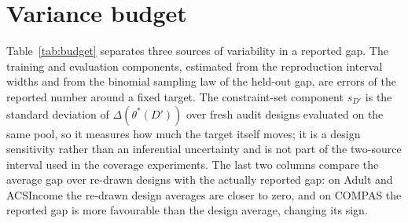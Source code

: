 \documentclass[11pt]{article}
\begin{document}
\begin{table}[h]
\centering
\small
\caption{Protocol A coverage of the population gap (nominal 0.95) and interval widths. The joint interval is valid in every setting.}
\label{tab:protocolA}
\end{table}

\section{Variance budget}

Table~\ref{tab:budget} separates three sources of variability in a reported gap. The training and evaluation components, estimated from the reproduction interval widths and from the binomial sampling law of the held-out gap, are errors of the reported number around a fixed target.  The constraint-set component $s_{D'}$ is the standard deviation of $\Delta(\theta^*(D'))$ over fresh audit designs evaluated on the same pool, so it measures how much the target itself moves; it is a design sensitivity rather than an inferential uncertainty and is not part of the two-source interval used in the coverage experiments.  The last two columns compare the average gap over re-drawn designs with the actually reported gap: on Adult and ACSIncome the re-drawn design averages are closer to zero, and on COMPAS the reported gap is more favourable than the design average, changing its sign.$\,$\par
\end{document}
